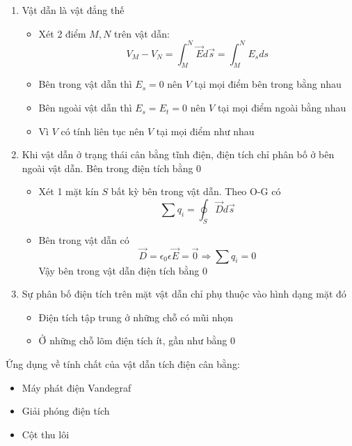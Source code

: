 \begin{enumerate}
  \item Vật dẫn là vật đẳng thế
  \begin{itemize}
    \item Xét 2 điểm $M, N$ trên vật dẫn:
    \begin{equation*}
      V_M - V_N = \int_{M}^{N} \vec{E}d\vec{s} = \int_{M}^{N} E_sds
    \end{equation*}
    \item Bên trong vật dẫn thì $E_s = 0$ nên $V$ tại mọi điểm bên trong bằng nhau
    \item Bên ngoài vật dẫn thì $E_s = E_t = 0$ nên $V$ tại mọi điểm ngoài bằng nhau
    \item Vì $V$ có tính liên tục nên $V$ tại mọi điểm như nhau
  \end{itemize}
  \item Khi vật dẫn ở trạng thái cân bằng tĩnh điện, điện tích chỉ phân bố ở bên ngoài vật dẫn. Bên trong điện tích bằng 0
  \begin{itemize}
    \item Xét 1 mặt kín $S$ bất kỳ bên trong vật dẫn. Theo O-G có
    \begin{equation*}
      \sum q_i = \oint_S \vec{D}d\vec{s}
    \end{equation*}
    \item Bên trong vật dẫn có 
    \begin{equation*}
      \vec{D} = \epsilon_0\epsilon\vec{E} = \vec{0} \Rightarrow \sum q_i = 0
    \end{equation*}
    Vậy bên trong vật dẫn điện tích bằng 0
  \end{itemize}
  \item Sự phân bố điện tích trên mặt vật dẫn chỉ phụ thuộc vào hình dạng mặt đó
  \begin{itemize}
    \item Điện tích tập trung ở những chỗ có mũi nhọn
    \item Ở những chỗ lõm điện tích ít, gần như bằng 0
  \end{itemize}
\end{enumerate}

Ứng dụng về tính chất của vật dẫn tích điện cân bằng:

\begin{itemize}
  \item Máy phát điện Vandegraf
  \item Giải phóng điện tích
  \item Cột thu lôi
\end{itemize}

